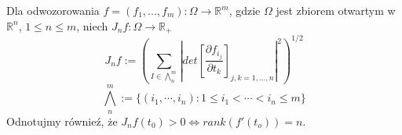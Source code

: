 \begin{defi}
	Dla odwozorowania $f = (f_1, ..., f_m): \Omega \rightarrow \mathbb{R}^m$, gdzie $\Omega$ jest zbiorem otwartym w $\mathbb{R}^n$, $1 \leq n \leq m$, niech $J_nf: \Omega \rightarrow \mathbb{R}_+$ $$ 
	J_nf := \left( \sum_{I \in \bigwedge_n^m} \left| det \left[ \frac{\partial f_{i_j}}{\partial t_k} \right]_{j,k=1,\dots,n} \right|^2 \right)^{1/2}
	$$
	$$
		\bigwedge_n^m := \{ (i_1, \cdots, i_n): 1 \leq i_1 < \cdots < i_n \leq m \}
	$$
	Odnotujmy równieź, że $J_nf(t_0) > 0 \Leftrightarrow rank(f'(t_o))  =n$.
\end{defi}
